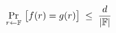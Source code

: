 \documentclass[preview]{standalone}
\begin{document}
\begin{align*}
\special{dvisvgm:raw <g id='unique000'>}\Pr_{r\leftarrow \mathbb{F}}\ \bigl[f(r) = g(r)\bigr] \;\leq\; \frac{d}{|\mathbb{F}|}\special{dvisvgm:raw </g>}
\end{align*}
\end{document}

